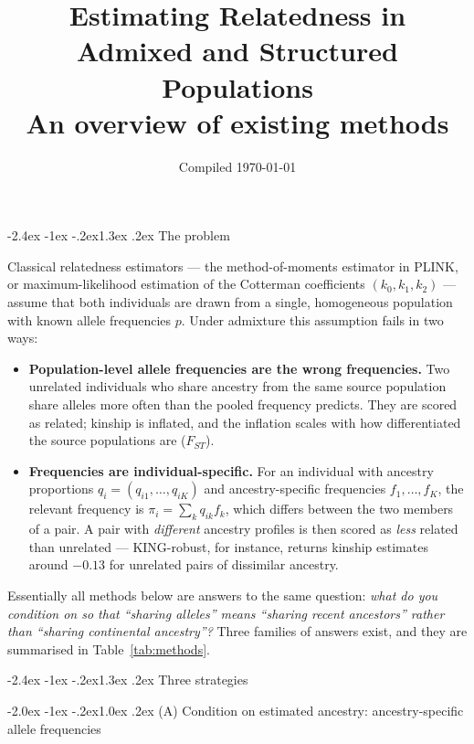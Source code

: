 \documentclass[10pt,a4paper]{article}
\title{\vspace{-1.4cm}\color{hdr}\bfseries Estimating Relatedness in Admixed and Structured Populations\\[2pt]
\large\mdseries\color{black} An overview of existing methods}
\author{}
\date{\small Compiled \today}
\makeatletter
\renewcommand\section{\@startsection{section}{1}{\z@}%
  {-2.4ex \@plus -1ex \@minus -.2ex}{1.3ex \@plus.2ex}%
  {\normalfont\large\bfseries\color{hdr}}}
\renewcommand\subsection{\@startsection{subsection}{2}{\z@}%
  {-2.0ex \@plus -1ex \@minus -.2ex}{1.0ex \@plus.2ex}%
  {\normalfont\normalsize\bfseries\color{hdr}}}
\newenvironment{tightitem}{%
  \begin{itemize}\setlength{\itemsep}{1pt}\setlength{\parskip}{0pt}%
  \setlength{\topsep}{3pt}\setlength{\parsep}{0pt}}{\end{itemize}}
\makeatother
\begin{document}
\maketitle
\vspace{-1.2cm}

\section{The problem}

Classical relatedness estimators --- the method-of-moments estimator in PLINK, or maximum-likelihood
estimation of the Cotterman coefficients $(k_0,k_1,k_2)$ --- assume that both individuals are drawn from a
single, homogeneous population with known allele frequencies $p$. Under admixture this assumption fails in
two ways:

\begin{tightitem}
  \item \textbf{Population-level allele frequencies are the wrong frequencies.} Two unrelated individuals
  who share ancestry from the same source population share alleles more often than the pooled frequency
  predicts. They are scored as related; kinship is inflated, and the inflation scales with how differentiated
  the source populations are ($F_{ST}$).
  \item \textbf{Frequencies are individual-specific.} For an individual with ancestry proportions
  $q_{i}=(q_{i1},\dots,q_{iK})$ and ancestry-specific frequencies $f_{1},\dots,f_{K}$, the relevant
  frequency is $\pi_{i}=\sum_{k} q_{ik} f_{k}$, which differs between the two members of a pair. A pair
  with \emph{different} ancestry profiles is then scored as \emph{less} related than unrelated --- KING-robust,
  for instance, returns kinship estimates around $-0.13$ for unrelated pairs of dissimilar ancestry.
\end{tightitem}

Essentially all methods below are answers to the same question: \emph{what do you condition on so that
``sharing alleles'' means ``sharing recent ancestors'' rather than ``sharing continental ancestry''?}
Three families of answers exist, and they are summarised in Table~\ref{tab:methods}.

\section{Three strategies}

\subsection{(A) Condition on estimated ancestry: ancestry-specific allele frequencies}
\end{document}
